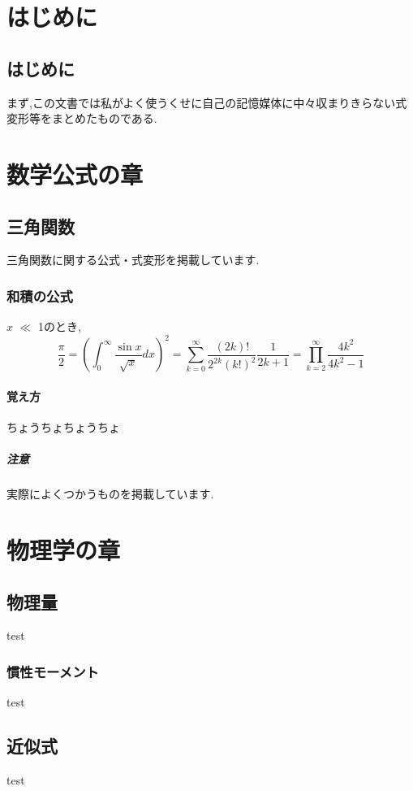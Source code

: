 \documentclass[]{jreport}
\begin{document}
\part{はじめに}
\chapter{はじめに}

まず,この文書では私がよく使うくせに自己の記憶媒体に中々収まりきらない式変形等をまとめたものである.

\part{数学公式の章}
\chapter{三角関数}

三角関数に関する公式・式変形を掲載しています.

\section{和積の公式}

$x$ $\ll$ 1のとき,
\begin{equation}
    \frac{\pi}{2} =
    \left( \int_{0}^{\infty} \frac{\sin x}{\sqrt{x}} dx \right)^2 =
    \sum_{k=0}^{\infty} \frac{(2k)!}{2^{2k}(k!)^2} \frac{1}{2k+1} =
    \prod_{k=2}^{\infty} \frac{4k^2}{4k^2 - 1}
\end{equation}

\subsection{覚え方}

ちょうちょちょうちょ

\subsubsection{注意}

実際によくつかうものを掲載しています.

\part{物理学の章}
\chapter{物理量}

test

\section{慣性モーメント}

test

\chapter{近似式}

test
\end{document}
